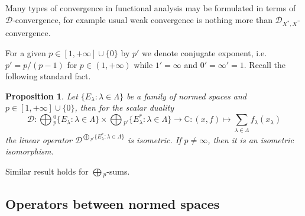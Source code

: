 \documentclass[12pt]{article}
\newtheorem{proposition}[theorem]{Proposition}
\begin{document}
Many types of convergence in functional analysis may be formulated in terms of
$\mathcal{D}$-convergence, for example usual weak convergence is nothing more
than $\mathcal{D}_{X^*,X}$-convergence. 

For a given $p\in[1,+\infty]\cup \{0 \}$ by $p'$ we denote conjugate exponent,
i.e. $p'=p/(p-1)$ for $p\in(1,+\infty)$ while $1'=\infty$ and $0'=\infty'=1$.
Recall the following standard fact.

\begin{proposition}\label{PrSumDuality} Let $ \{E_\lambda:\lambda\in \Lambda \}$
be a family of normed spaces and $p\in[1,+\infty]\cup \{0 \}$, then for the 
scalar duality
$$
\mathcal{D}:
    \bigoplus{}_p^0 \{E_\lambda:\lambda\in \Lambda \}\times 
    \bigoplus{}_{p'} \{E_\lambda^*:\lambda\in \Lambda \}\to \mathbb{C}: 
    (x,f)\mapsto\sum\limits_{\lambda\in \Lambda} f_\lambda(x_\lambda)
$$
the linear operator 
$\mathcal{D}^{\bigoplus{}_{p'} \{E_\lambda^*:\lambda\in \Lambda \}}$ 
is isometric. If $p\neq\infty$, then it is an isometric isomorphism.
\end{proposition}

Similar result holds for $\bigoplus{}_p$-sums.
























\subsection{Operators between normed spaces}
\end{document}
